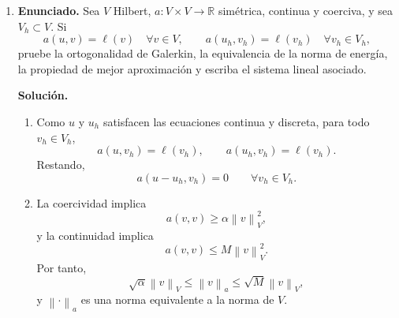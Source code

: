 \documentclass[11pt]{article}
\newcommand{\norm}[1]{\left\lVert #1\right\rVert}
\def\R{\mathbb R}
\def\dx{\mbox{\(\,\mathrm{d}x\)}}
\begin{document}
\begin{enumerate}[label=\textbf{\arabic*.}, leftmargin=*]
\begin{enumerate}[label=(\alph*)]
        \item En Neumann puro,
        \[
            a(w,v)=\int_\Omega \nabla w\cdot\nabla v\dx,
            \qquad
            \ell(v)=\int_\Omega fv\dx+\langle r,\gamma_0v\rangle_{\partial\Omega}.
        \]
        Toda función constante pertenece al núcleo de $a$, porque su gradiente es cero. Si existe solución, al tomar $v=1$ se obtiene necesariamente
        \[
            0=a(u,1)=\ell(1)=\int_\Omega f\dx+\langle r,1\rangle_{\partial\Omega}.
        \]
        Por tanto, la compatibilidad es
        \[
            \int_\Omega f\dx+\langle r,1\rangle_{\partial\Omega}=0.
        \]
        La unicidad sólo puede esperarse módulo constantes. Para fijar una solución única se trabaja en
        \[
            H^1_\ast(\Omega)=\left\{v\in H^1(\Omega):\int_\Omega v\dx=0\right\}.
        \]
        Allí, Poincaré--Wirtinger da
        \[
            \norm{v}_{H^1(\Omega)}\le C\norm{\nabla v}_{L^2(\Omega)},
        \]
        y entonces $a$ es coerciva sobre $H^1_\ast(\Omega)$. Si $c(x)\ge c_0>0$, las constantes ya no están en el núcleo, no se necesita compatibilidad de Neumann puro y el problema es coercivo en todo $H^1(\Omega)$.
    \end{enumerate}

    \item \textbf{Enunciado.} Sea $V$ Hilbert, $a:V\times V\to\R$ simétrica, continua y coerciva, y sea $V_h\subset V$. Si
    \[
        a(u,v)=\ell(v)\quad\forall v\in V,
        \qquad
        a(u_h,v_h)=\ell(v_h)\quad\forall v_h\in V_h,
    \]
    pruebe la ortogonalidad de Galerkin, la equivalencia de la norma de energía, la propiedad de mejor aproximación y escriba el sistema lineal asociado.

    \textbf{Solución.}
    \begin{enumerate}[label=(\alph*)]
        \item Como $u$ y $u_h$ satisfacen las ecuaciones continua y discreta, para todo $v_h\in V_h$,
        \[
            a(u,v_h)=\ell(v_h),
            \qquad
            a(u_h,v_h)=\ell(v_h).
        \]
        Restando,
        \[
            a(u-u_h,v_h)=0\qquad\forall v_h\in V_h.
        \]

        \item La coercividad implica
        \[
            a(v,v)\ge \alpha\norm{v}_V^2,
        \]
        y la continuidad implica
        \[
            a(v,v)\le M\norm{v}_V^2.
        \]
        Por tanto,
        \[
            \sqrt{\alpha}\norm{v}_V\le \norm{v}_a\le \sqrt{M}\norm{v}_V,
        \]
        y $\norm{\cdot}_a$ es una norma equivalente a la norma de $V$.


\end{enumerate}
\end{enumerate}
\end{document}
